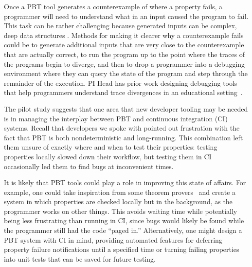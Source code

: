 Once a PBT tool generates a counterexample of where a property fails, a
programmer will need to understand what in an input caused the program to fail.
This task can be rather challenging because generated inputs can be complex,
deep data structures . Methods for making it clearer why a counterexample
fails could be to generate additional inputs that are very close to the
counterexample that are actually correct, to run the program up to the point
where the traces of the programs begin to diverge, and then to drop a programmer
into a debugging environment where they can query the state of the program and
step through the remainder of the execution. PI Head has prior work designing
debugging tools that help programmers understand trace divergences in an
educational setting~\cite{suzuki2017tracediff}.   


The pilot study suggests that one area that new developer tooling may be
needed is in managing the interplay between PBT and continuous integration (CI)
systems. Recall that developers we spoke with pointed out frustration with the
fact that PBT is both nondeterministic and long-running. This combination left
them unsure of exactly where and when to test their properties: testing
properties locally slowed down their workflow, but testing them in CI
occasionally led them to find bugs at inconvenient times.

It is likely that PBT tools could play a role in improving this state of
affairs. For example, one could take inspiration from some theorem
provers~\cite{berghofer2004random} and create a system in which properties are
checked locally but in the background, as the programmer works on other things.
This avoids waiting time while potentially being less frustrating than running
in CI, since bugs would likely be found while the programmer still had the code
``paged in.'' Alternatively, one might design a PBT system with CI in mind,
providing automated features for deferring property failure notifications until
a specified time or turning failing properties into unit tests that can be saved
for future testing.

